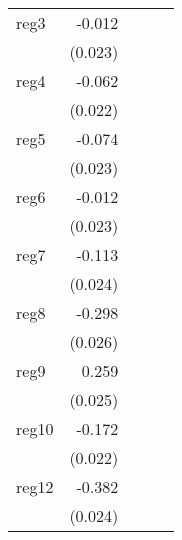 {\begin{longtable}{l*{4}{D{.}{.}{-1}}}
\addlinespace
reg3        &      -0.012         &                     &                     &                     \\
            &     (0.023)         &                     &                     &                     \\
\addlinespace
reg4        &      -0.062\sym{**} &                     &                     &                     \\
            &     (0.022)         &                     &                     &                     \\
\addlinespace
reg5        &      -0.074\sym{**} &                     &                     &                     \\
            &     (0.023)         &                     &                     &                     \\
\addlinespace
reg6        &      -0.012         &                     &                     &                     \\
            &     (0.023)         &                     &                     &                     \\
\addlinespace
reg7        &      -0.113\sym{***}&                     &                     &                     \\
            &     (0.024)         &                     &                     &                     \\
\addlinespace
reg8        &      -0.298\sym{***}&                     &                     &                     \\
            &     (0.026)         &                     &                     &                     \\
\addlinespace
reg9        &       0.259\sym{***}&                     &                     &                     \\
            &     (0.025)         &                     &                     &                     \\
\addlinespace
reg10       &      -0.172\sym{***}&                     &                     &                     \\
            &     (0.022)         &                     &                     &                     \\
\addlinespace
reg12       &      -0.382\sym{***}&                     &                     &                     \\
            &     (0.024)         &                     &                     &                     \\

\end{longtable}}
